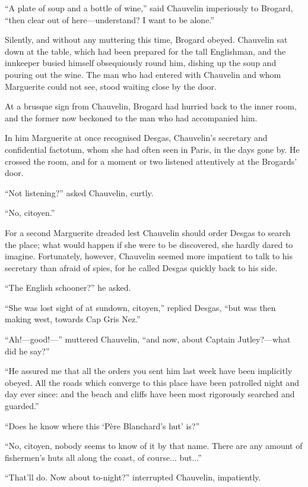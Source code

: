 \documentclass[paper=5.5in:8.5in,BCOR=7mm,twoside,DIV=calc,12pt,usegeometry,chapterprefix,endperiod,headings=big]{scrbook}
\begin{document}
\enquote{A plate of soup and a bottle of wine,} said Chauvelin imperiously to Brogard, \enquote{then clear out of here---understand? I want to be alone.}

Silently, and without any muttering this time, Brogard obeyed. Chauvelin sat down at the table, which had been prepared for the tall Englishman, and the innkeeper busied himself obsequiously round him, dishing up the soup and pouring out the wine. The man who had entered with Chauvelin and whom Marguerite could not see, stood waiting close by the door.

At a brusque sign from Chauvelin, Brogard had hurried back to the inner room, and the former now beckoned to the man who had accompanied him.

In him Marguerite at once recognised Desgas, Chauvelin's secretary and confidential factotum, whom she had often seen in Paris, in the days gone by. He crossed the room, and for a moment or two listened attentively at the Brogards’ door.

\enquote{Not listening?} asked Chauvelin, curtly.

\enquote{No, citoyen.}

For a second Marguerite dreaded lest Chauvelin should order Desgas to search the place; what would happen if she were to be discovered, she hardly dared to imagine. Fortunately, however, Chauvelin seemed more impatient to talk to his secretary than afraid of spies, for he called Desgas quickly back to his side.

\enquote{The English schooner?} he asked.

\enquote{She was lost sight of at sundown, citoyen,} replied Desgas, \enquote{but was then making west, towards Cap Gris Nez.}

\enquote{Ah!---good!---} muttered Chauvelin, \enquote{and now, about Captain Jutley?---what did he say?}

\enquote{He assured me that all the orders you sent him last week have been implicitly obeyed. All the roads which converge to this place have been patrolled night and day ever since: and the beach and cliffs have been most rigorously searched and guarded.}

\enquote{Does he know where this \enquote{Père Blanchard's hut} is?}

\enquote{No, citoyen, nobody seems to know of it by that name. There are any amount of fishermen's huts all along the coast, of course... but...}

\enquote{That'll do. Now about to-night?} interrupted Chauvelin, impatiently.
\end{document}
